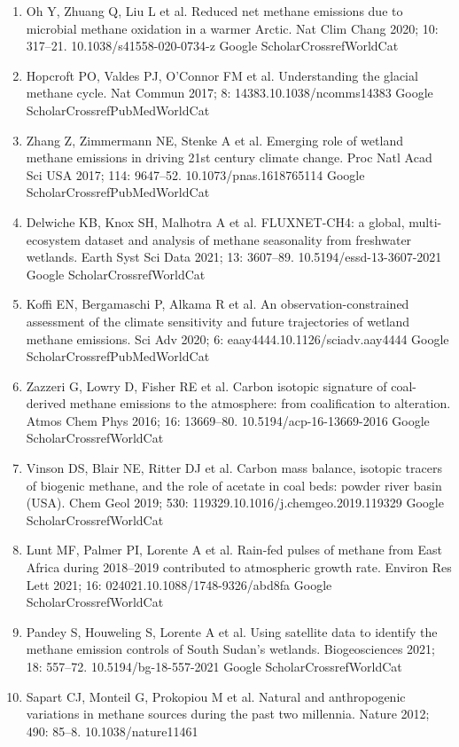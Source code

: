 \documentclass[a4paper,12pt]{article}
\begin{document}
{\begin{thebibliography}{}
\begin{enumerate}
    Google ScholarCrossrefWorldCat 
    \item	Oh Y, Zhuang Q, Liu L et al.  Reduced net methane emissions due to microbial methane oxidation in a warmer Arctic. Nat Clim Chang 2020; 10: 317–21. 10.1038/s41558-020-0734-z
    Google ScholarCrossrefWorldCat 
    \item	Hopcroft PO, Valdes PJ, O’Connor FM et al.  Understanding the glacial methane cycle. Nat Commun 2017; 8: 14383.10.1038/ncomms14383
    Google ScholarCrossrefPubMedWorldCat 
    \item	Zhang Z, Zimmermann NE, Stenke A et al.  Emerging role of wetland methane emissions in driving 21st century climate change. Proc Natl Acad Sci USA 2017; 114: 9647–52. 10.1073/pnas.1618765114
    Google ScholarCrossrefPubMedWorldCat 
    \item	Delwiche KB, Knox SH, Malhotra A et al.  FLUXNET-CH4: a global, multi-ecosystem dataset and analysis of methane seasonality from freshwater wetlands. Earth Syst Sci Data 2021; 13: 3607–89. 10.5194/essd-13-3607-2021
    Google ScholarCrossrefWorldCat 
    \item	Koffi EN, Bergamaschi P, Alkama R et al.  An observation-constrained assessment of the climate sensitivity and future trajectories of wetland methane emissions. Sci Adv 2020; 6: eaay4444.10.1126/sciadv.aay4444
    Google ScholarCrossrefPubMedWorldCat 
    \item	Zazzeri G, Lowry D, Fisher RE et al.  Carbon isotopic signature of coal-derived methane emissions to the atmosphere: from coalification to alteration. Atmos Chem Phys 2016; 16: 13669–80. 10.5194/acp-16-13669-2016
    Google ScholarCrossrefWorldCat 
    \item	Vinson DS, Blair NE, Ritter DJ et al.  Carbon mass balance, isotopic tracers of biogenic methane, and the role of acetate in coal beds: powder river basin (USA). Chem Geol 2019; 530: 119329.10.1016/j.chemgeo.2019.119329
    Google ScholarCrossrefWorldCat 
    \item	Lunt MF, Palmer PI, Lorente A et al.  Rain-fed pulses of methane from East Africa during 2018–2019 contributed to atmospheric growth rate. Environ Res Lett 2021; 16: 024021.10.1088/1748-9326/abd8fa
    Google ScholarCrossrefWorldCat 
    \item	Pandey S, Houweling S, Lorente A et al.  Using satellite data to identify the methane emission controls of South Sudan's wetlands. Biogeosciences 2021; 18: 557–72. 10.5194/bg-18-557-2021
    Google ScholarCrossrefWorldCat 
    \item	Sapart CJ, Monteil G, Prokopiou M et al.  Natural and anthropogenic variations in methane sources during the past two millennia. Nature 2012; 490: 85–8. 10.1038/nature11461

\end{enumerate}
\end{thebibliography}}
\end{document}
